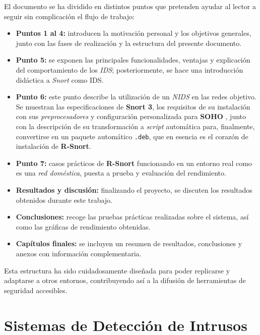 \documentclass[11pt,a4paper,twoside]{report}
\begin{document}
El documento se ha dividido en distintos puntos que pretenden ayudar al lector a seguir sin complicación el flujo de trabajo:

\begin{itemize}
	\item \textbf{Puntos 1 al 4:} introducen la motivación personal y los objetivos generales, junto con las fases de realización y la estructura del presente documento.
	
	\item \textbf{Punto 5:} se exponen las principales funcionalidades, ventajas y explicación del comportamiento de los \textit{IDS}; posteriormente, se hace una introducción didáctica a \textit{Snort} como IDS.
	
	\item \textbf{Punto 6:} este punto describe la utilización de un \textit{NIDS} en las redes objetivo. Se muestran las especificaciones de \textbf{Snort 3}, los requisitos de su instalación con sus \textit{preprocesadores} y configuración personalizada para \textbf{SOHO} \cite{cocsar2017firewall}, junto con la descripción de su transformación a \textit{script} automática para, finalmente, convertirse en un paquete automático \texttt{.deb}, que en esencia es el corazón de instalación de \textbf{R-Snort}.
	
	\item \textbf{Punto 7:} casos prácticos de \textbf{R-Snort} funcionando en un entorno real como es una \textit{red doméstica}, puesta a prueba y evaluación del rendimiento.
	
	\item \textbf{Resultados y discusión:} finalizando el proyecto, se discuten los resultados obtenidos durante este trabajo.
	
	\item \textbf{Conclusiones:} recoge las pruebas prácticas realizadas sobre el sistema, así como las gráficas de rendimiento obtenidas.
	
	\item \textbf{Capítulos finales:} se incluyen un resumen de resultados, conclusiones y anexos con información complementaria.
\end{itemize}

Esta estructura ha sido cuidadosamente diseñada para poder replicarse y adaptarse a otros entornos, contribuyendo así a la difusión de herramientas de seguridad accesibles.



\chapter{Sistemas de Detección de Intrusos}
\end{document}
